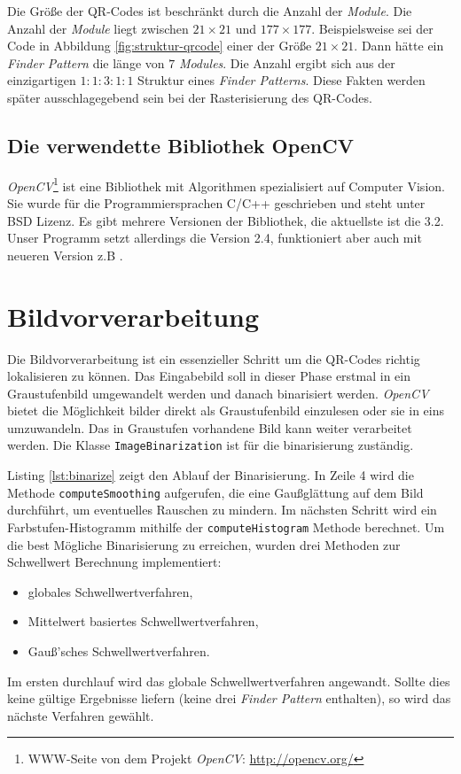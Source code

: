 Die Größe der QR-Codes ist beschränkt durch die Anzahl der \emph{Module}. Die Anzahl der \emph{Module} liegt zwischen $21 \times 21$ und $177 \times 177$. Beispielsweise sei der Code in Abbildung \ref{fig:struktur-qrcode} einer der Größe $21 \times 21$. Dann hätte ein \emph{Finder Pattern} die länge von $7$ \emph{Modules}. Die Anzahl ergibt sich aus der einzigartigen $1:1:3:1:1$ Struktur eines \emph{Finder Patterns}. Diese Fakten werden später ausschlagegebend sein bei der Rasterisierung des QR-Codes.

\section{Die verwendette Bibliothek OpenCV}
\emph{OpenCV}\footnote{WWW-Seite von dem Projekt \emph{OpenCV}: \url{http://opencv.org/}} ist eine Bibliothek mit Algorithmen spezialisiert auf \glqq Computer Vision\grqq . Sie wurde für die Programmiersprachen C/C++ geschrieben und steht unter BSD Lizenz. Es gibt mehrere Versionen der Bibliothek, die aktuellste ist die 3.2. Unser Programm setzt allerdings die Version 2.4, funktioniert aber auch mit neueren Version z.B .



\chapter{Bildvorverarbeitung}
Die Bildvorverarbeitung ist ein essenzieller Schritt um die QR-Codes richtig lokalisieren zu können. Das Eingabebild soll in dieser Phase erstmal in ein Graustufenbild umgewandelt werden und danach binarisiert werden. \emph{OpenCV} bietet die Möglichkeit bilder direkt als Graustufenbild einzulesen oder sie in eins umzuwandeln. Das in Graustufen vorhandene Bild kann weiter verarbeitet werden.
Die Klasse \texttt{ImageBinarization} ist für die binarisierung zuständig. 

Listing \ref{lst:binarize} zeigt den Ablauf der Binarisierung. In Zeile 4 wird die Methode \texttt{computeSmoothing} aufgerufen, die eine Gaußglättung auf dem Bild durchführt, um eventuelles Rauschen zu mindern. Im nächsten Schritt wird ein Farbstufen-Histogramm mithilfe der \texttt{computeHistogram} Methode berechnet. Um die best Mögliche Binarisierung zu erreichen, wurden drei Methoden zur Schwellwert Berechnung implementiert:
\begin{itemize}
	\item globales Schwellwertverfahren,
	\item Mittelwert basiertes Schwellwertverfahren,
	\item Gauß'sches Schwellwertverfahren.
\end{itemize} 
Im ersten durchlauf wird das globale Schwellwertverfahren angewandt. Sollte dies keine gültige Ergebnisse liefern (keine drei \emph{Finder Pattern} enthalten), so wird das nächste Verfahren gewählt. \\

